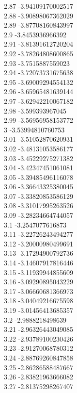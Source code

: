 {2.87	-3.94109170002517\\
2.88	-3.90898067362029\\
2.89	-3.87708160843997\\
2.9	-3.8453936966392\\
2.91	-3.81391612720204\\
2.92	-3.78264808600865\\
2.93	-3.7515887559023\\
2.94	-3.72073731675638\\
2.95	-3.69009294554132\\
2.96	-3.65965481639144\\
2.97	-3.62942210067182\\
2.98	-3.599393967045\\
2.99	-3.56956958153772\\
3	-3.53994810760753\\
3.01	-3.51052870620931\\
3.02	-3.48131053586177\\
3.03	-3.45229275271382\\
3.04	-3.42347451061081\\
3.05	-3.39485496116078\\
3.06	-3.36643325380045\\
3.07	-3.33820853586129\\
3.08	-3.31017995263526\\
3.09	-3.28234664744057\\
3.1	-3.2547077616873\\
3.11	-3.22726243494277\\
3.12	-3.20000980499691\\
3.13	-3.17294900792736\\
3.14	-3.14607917816446\\
3.15	-3.11939944855609\\
3.16	-3.09290895043229\\
3.17	-3.06660681366973\\
3.18	-3.04049216675598\\
3.19	-3.01456413685357\\
3.2	-2.9888218498639\\
3.21	-2.96326443049085\\
3.22	-2.93789100230426\\
3.23	-2.91270068780312\\
3.24	-2.88769260847858\\
3.25	-2.86286588487667\\
3.26	-2.83821963666082\\
3.27	-2.81375298267407\\
}

